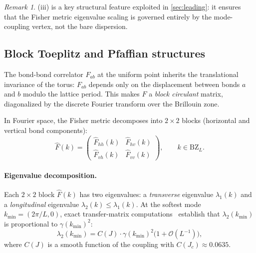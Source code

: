 \documentclass[11pt]{article}
\theoremstyle{definition}
\theoremstyle{remark}
\newtheorem{remark}[theorem]{Remark}
\newcommand{\Fish}{F}
\newcommand{\Jc}{J_c}
\newcommand{\BZ}{\mathrm{BZ}}
\newcommand{\cO}{\mathcal{O}}
\begin{document}
\begin{remark}
(iii) is a key structural feature
exploited in \cref{sec:leading}: it ensures that the Fisher metric
eigenvalue scaling is governed entirely by the mode-coupling vertex,
not the bare dispersion.
\end{remark}


\subsection{Block Toeplitz and Pfaffian structures}
\label{subsec:toeplitz-intro}

The bond-bond correlator $\Fish_{ab}$ at the uniform point inherits
the translational invariance of the torus: $\Fish_{ab}$ depends only
on the displacement between bonds $a$ and $b$ modulo the lattice period.
This makes $\Fish$ a \emph{block circulant} matrix, diagonalized by the
discrete Fourier transform over the Brillouin zone.

In Fourier space, the Fisher metric decomposes into $2 \times 2$ blocks
(horizontal and vertical bond components):
\begin{equation}
  \hat{\Fish}(k) = \begin{pmatrix}
    \hat{\Fish}_{hh}(k) & \hat{\Fish}_{hv}(k) \\
    \hat{\Fish}_{vh}(k) & \hat{\Fish}_{vv}(k)
  \end{pmatrix},
  \qquad k \in \BZ_L.
  \label{eq:fisher-fourier-block}
\end{equation}

\paragraph{Eigenvalue decomposition.}
Each $2 \times 2$ block $\hat{\Fish}(k)$ has two eigenvalues:
a \emph{transverse} eigenvalue $\lambda_1(k)$ and a \emph{longitudinal}
eigenvalue $\lambda_2(k) \leq \lambda_1(k)$.
At the softest mode $k_{\min} = (2\pi/L, 0)$, exact transfer-matrix
computations~\cite{PredLetter} establish that $\lambda_2(k_{\min})$
is proportional to $\gamma(k_{\min})^2$:
\begin{equation}
  \lambda_2(k_{\min}) = C(J) \cdot \gamma(k_{\min})^2
    \bigl(1 + \cO(L^{-1})\bigr),
  \label{eq:lambda2-dispersion}
\end{equation}
where $C(J)$ is a smooth function of the coupling with
$C(\Jc) \approx 0.0635$.
\end{document}
